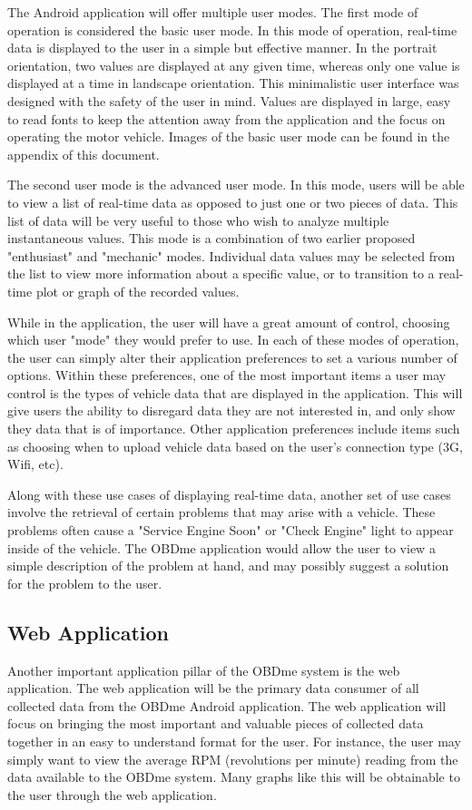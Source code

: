 \documentclass[12pt]{article}
\begin{document}
The Android application will offer multiple user modes.  The first mode of operation is considered the basic user mode.  In this mode of operation, real-time data is displayed to the user in a simple but effective manner.  In the portrait orientation, two values are displayed at any given time, whereas only one value is displayed at a time in landscape orientation.  This minimalistic user interface was designed with the safety of the user in mind.  Values are displayed in large, easy to read fonts to keep the attention away from the application and the focus on operating the motor vehicle.  Images of the basic user mode can be found in the appendix of this document.

The second user mode is the advanced user mode.  In this mode, users will be able to view a list of real-time data as opposed to just one or two pieces of data.  This list of data will be very useful to those who wish to analyze multiple instantaneous values.  This mode is a combination of two earlier proposed "enthusiast" and "mechanic" modes.  Individual data values may be selected from the list to view more information about a specific value, or to transition to a real-time plot or graph of the recorded values.

While in the application, the user will have a great amount of control, choosing which user "mode" they would prefer to use.  In each of these modes of operation, the user can simply alter their application preferences to set a various number of options.  Within these preferences, one of the most important items a user may control is the types of vehicle data that are displayed in the application.  This will give users the ability to disregard data they are not interested in, and only show they data that is of importance.  Other application preferences include items such as choosing when to upload vehicle data based on the user's connection type (3G, Wifi, etc).

Along with these use cases of displaying real-time data, another set of use cases involve the retrieval of certain problems that may arise with a vehicle.  These problems often cause a "Service Engine Soon" or "Check Engine" light to appear inside of the vehicle.  The OBDme application would allow the user to view a simple description of the problem at hand, and may possibly suggest a solution for the problem to the user.

\subsection{Web Application}\label{subsec:Web Application}
Another important application pillar of the OBDme system is the web application.  The web application will be the primary data consumer of all collected data from the OBDme Android application.  The web application will focus on bringing the most important and valuable pieces of collected data together in an easy to understand format for the user.  For instance, the user may simply want to view the average RPM (revolutions per minute) reading from the data available to the OBDme system.  Many graphs like this will be obtainable to the user through the web application.
\end{document}
